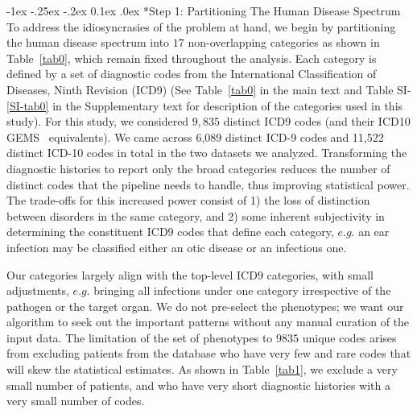\documentclass[onecolumn,,10pt]{IEEEtran}
\makeatletter
\renewcommand\subsection{\@startsection {section}{1}{\z@}%
  {-1ex \@plus -.25ex \@minus -.2ex}%
  {0.1ex \@plus.0ex}%
  {\fontsize{11}{12}\selectfont\bfseries\sffamily\color{DodgerBlue4}}}
\makeatother
\begin{document}
\subsection*{Step 1: Partitioning The Human Disease Spectrum} To address the idiosyncrasies of the problem at hand, we begin by partitioning the human disease spectrum into  $17$ non-overlapping  categories  as shown in Table~\ref{tab0}, which remain fixed throughout the analysis. Each category is defined by a set of diagnostic codes from the International Classification of Diseases, Ninth Revision (ICD9) (See Table~\ref{tab0} in the main text  and Table SI-\ref{SI-tab0} in the Supplementary text for description of  the categories used in this study).
For this study, we considered $9,835$ distinct ICD9 codes (and their ICD10 GEMS~\cite{GEMS} equivalents). We came across 6,089 distinct ICD-9 codes and 11,522 distinct ICD-10 codes in total in the two datasets we analyzed. Transforming the diagnostic histories to report only the broad categories   reduces the number of distinct codes that the pipeline needs to handle, thus improving statistical  power.  The trade-offs for this increased power consist of 1) the loss of distinction between disorders in the same category, and  2) some inherent subjectivity in determining the constituent ICD9 codes that define each category, $e.g.$ an ear infection may be classified either an otic disease or an infectious one.

Our categories largely align with the top-level ICD9 categories, with small 
adjustments, $e.g.$ bringing all infections under one category irrespective of the pathogen or the target organ.
We do not pre-select the phenotypes; we want our algorithm to seek out the important patterns without any manual curation of the input data. The limitation of the set of phenotypes to $9835$ unique codes arises from excluding patients from the database who have very few and rare codes that will skew the statistical estimates. As shown in Table~\ref{tab1}, we exclude a very small number of patients, and who have  very short diagnostic histories with a very small number of codes.
\end{document}

